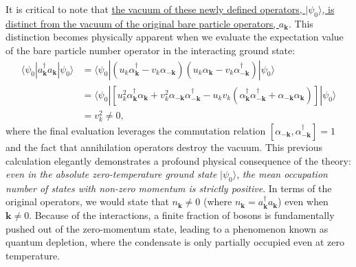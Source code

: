 It is critical to note that \uline{the vacuum of these newly defined operators, \( |\psi_0\rangle \), is distinct from the vacuum of the original bare particle operators, \( a_{\mathbf{k}} \)}. This distinction becomes physically apparent when we evaluate the expectation value of the bare particle number operator in the interacting ground state:
\[
    \begin{aligned}
        \langle \psi_0 | a_{\mathbf{k}}^\dagger a_{\mathbf{k}} | \psi_0 \rangle & = \langle \psi_0 | (u_k \alpha_{\mathbf{k}}^\dagger - v_k \alpha_{-\mathbf{k}})(u_k \alpha_{\mathbf{k}} - v_k \alpha_{-\mathbf{k}}^\dagger) | \psi_0 \rangle                                                                                                                       \\
                                                                                & = \langle \psi_0 | \left[ u_k^2 \alpha_{\mathbf{k}}^\dagger \alpha_{\mathbf{k}} + v_k^2 \alpha_{-\mathbf{k}} \alpha_{-\mathbf{k}}^\dagger - u_k v_k (\alpha_{\mathbf{k}}^\dagger \alpha_{-\mathbf{k}}^\dagger + \alpha_{-\mathbf{k}} \alpha_{\mathbf{k}}) \right] | \psi_0 \rangle \\
                                                                                & = v_k^2 \neq 0,
    \end{aligned}
\]
where the final evaluation leverages the commutation relation \( [\alpha_{-\mathbf{k}}, \alpha_{-\mathbf{k}}^\dagger] = 1 \) and the fact that annihilation operators destroy the vacuum. This previous calculation elegantly demonstrates a profound physical consequence of the theory: \textit{even in the absolute zero-temperature ground state} \( |\psi_0\rangle \), \textit{the mean occupation number of states with non-zero momentum is strictly positive}. In terms of the original operators, we would state that \( n_{\mathbf{k}} \neq 0 \) (where \( n_{\mathbf{k}} = a_{\mathbf{k}}^\dagger a_{\mathbf{k}} \)) even when \( \mathbf{k} \neq 0 \). Because of the interactions, a finite fraction of bosons is fundamentally pushed out of the zero-momentum state, leading to a phenomenon known as quantum depletion, where the condensate is only partially occupied even at zero temperature.